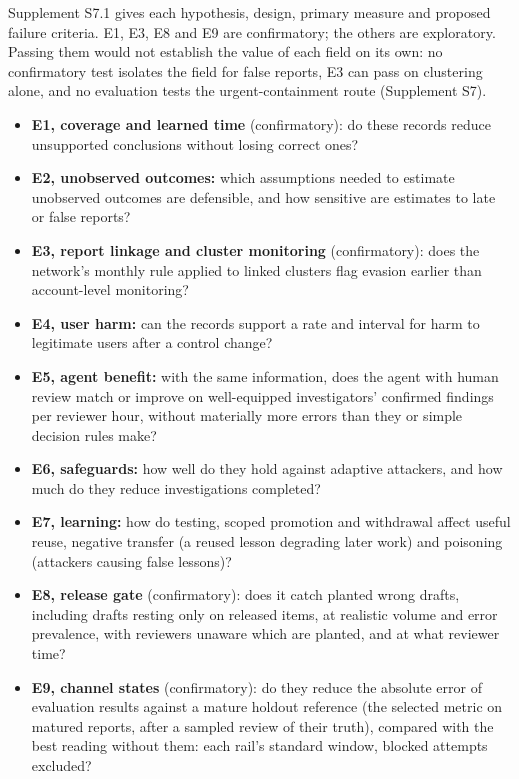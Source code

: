 \documentclass[
  11pt,
]{article}
\providecommand{\tightlist}{%
  \setlength{\itemsep}{0pt}\setlength{\parskip}{0pt}}
\renewcommand{\tightlist}{\setlength{\itemsep}{0pt plus 1pt}\setlength{\parskip}{0pt}}
\begin{document}
Supplement S7.1 gives each hypothesis, design, primary measure and
proposed failure criteria. E1, E3, E8 and E9 are confirmatory; the
others are exploratory. Passing them would not establish the value of
each field on its own: no confirmatory test isolates the field for false
reports, E3 can pass on clustering alone, and no evaluation tests the
urgent-containment route (Supplement S7).

\begin{itemize}
\tightlist
\item
  \textbf{E1, coverage and learned time} (confirmatory): do these
  records reduce unsupported conclusions without losing correct ones?
\item
  \textbf{E2, unobserved outcomes:} which assumptions needed to estimate
  unobserved outcomes are defensible, and how sensitive are estimates to
  late or false reports?
\item
  \textbf{E3, report linkage and cluster monitoring} (confirmatory):
  does the network's monthly rule applied to linked clusters flag
  evasion earlier than account-level monitoring?
\item
  \textbf{E4, user harm:} can the records support a rate and interval
  for harm to legitimate users after a control change?
\item
  \textbf{E5, agent benefit:} with the same information, does the agent
  with human review match or improve on well-equipped investigators'
  confirmed findings per reviewer hour, without materially more errors
  than they or simple decision rules make?
\item
  \textbf{E6, safeguards:} how well do they hold against adaptive
  attackers, and how much do they reduce investigations completed?
\item
  \textbf{E7, learning:} how do testing, scoped promotion and withdrawal
  affect useful reuse, negative transfer (a reused lesson degrading
  later work) and poisoning (attackers causing false lessons)?
\item
  \textbf{E8, release gate} (confirmatory): does it catch planted wrong
  drafts, including drafts resting only on released items, at realistic
  volume and error prevalence, with reviewers unaware which are planted,
  and at what reviewer time?
\item
  \textbf{E9, channel states} (confirmatory): do they reduce the
  absolute error of evaluation results against a mature holdout
  reference (the selected metric on matured reports, after a sampled
  review of their truth), compared with the best reading without them:
  each rail's standard window, blocked attempts excluded?
\end{itemize}
\end{document}
